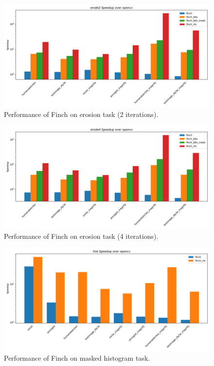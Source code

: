 
\begin{figure}
	\includegraphics[width=\linewidth]{erode2_speedup_over_opencv.png}
    \caption{Performance of Finch on erosion task (2 iterations).}
\end{figure}

\begin{figure}
	\includegraphics[width=\linewidth]{erode4_speedup_over_opencv.png}
    \caption{Performance of Finch on erosion task (4 iterations).}
\end{figure}

\begin{figure}
	\includegraphics[width=\linewidth]{hist_speedup_over_opencv.png}
    \caption{Performance of Finch on masked histogram task.}
\end{figure}

